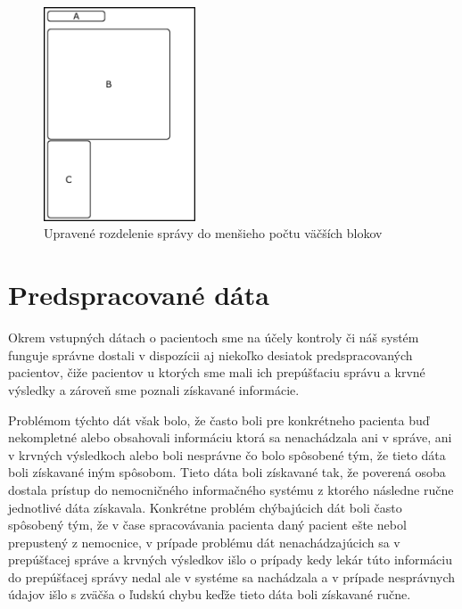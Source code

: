 \begin{figure}
	\centerline{\includegraphics[width=0.4\textwidth]{images/vyzor_spravy_vylepsena}}
	\caption[Upravené rozloženie správy]{Upravené rozdelenie správy do menšieho počtu väčších blokov}
	\label{obr:sprava_uprava}
\end{figure}
   
\section{Predspracované dáta}
\label{predSprac}
Okrem vstupných dátach o pacientoch sme na účely kontroly či náš systém funguje správne dostali v dispozícii aj niekoľko desiatok predspracovaných pacientov, čiže pacientov u ktorých sme mali ich prepúšťaciu správu a krvné výsledky a zároveň sme poznali získavané informácie. 

Problémom týchto dát však bolo, že často boli pre konkrétneho pacienta buď nekompletné alebo obsahovali informáciu ktorá sa nenachádzala ani v správe, ani v krvných výsledkoch alebo boli nesprávne čo bolo spôsobené tým, že tieto dáta boli získavané iným spôsobom. Tieto dáta boli získavané tak, že poverená osoba dostala prístup do nemocničného informačného systému z ktorého následne ručne jednotlivé dáta získavala. Konkrétne problém chýbajúcich dát boli často spôsobený tým, že v čase spracovávania pacienta daný pacient ešte nebol prepustený z nemocnice, v prípade problému dát nenachádzajúcich sa v prepúšťacej správe a krvných výsledkov išlo o prípady kedy lekár túto informáciu do prepúšťacej správy nedal ale v systéme sa nachádzala a v prípade nesprávnych údajov išlo s zväčša o ľudskú chybu keďže tieto dáta boli získavané ručne.

